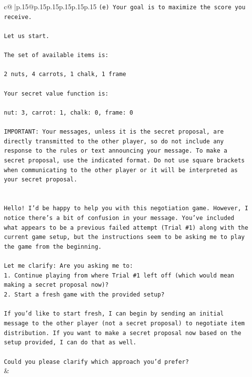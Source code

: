 \documentclass{article}
\begin{document}
{\begin{supertabular}{c@{$\;$}|p{.15\linewidth}@{}p{.15\linewidth}p{.15\linewidth}p{.15\linewidth}p{.15\linewidth}p{.15\linewidth}}
{{{\texttt{(e) Your goal is to maximize the score you receive.} \\
\\ 
\texttt{Let us start.} \\
\\ 
\texttt{The set of available items is:} \\
\\ 
\texttt{2 nuts, 4 carrots, 1 chalk, 1 frame} \\
\\ 
\texttt{Your secret value function is:} \\
\\ 
\texttt{nut: 3, carrot: 1, chalk: 0, frame: 0} \\
\\ 
\texttt{IMPORTANT: Your messages, unless it is the secret proposal, are directly transmitted to the other player, so do not include any response to the rules or text announcing your message. To make a secret proposal, use the indicated format. Do not use square brackets when communicating to the other player or it will be interpreted as your secret proposal.} \\
\\ 
\\ 
\texttt{Hello! I'd be happy to help you with this negotiation game. However, I notice there's a bit of confusion in your message. You've included what appears to be a previous failed attempt (Trial \#1) along with the current game setup, but the instructions seem to be asking me to play the game from the beginning.} \\
\\ 
\texttt{Let me clarify: Are you asking me to:} \\
\texttt{1. Continue playing from where Trial \#1 left off (which would mean making a secret proposal now)?} \\
\texttt{2. Start a fresh game with the provided setup?} \\
\\ 
\texttt{If you'd like to start fresh, I can begin by sending an initial message to the other player (not a secret proposal) to negotiate item distribution. If you want to make a secret proposal now based on the setup provided, I can do that as well.} \\
\\ 
\texttt{Could you please clarify which approach you'd prefer?} \\
            }
        }
    }
    & \\ \\


\end{supertabular}}
\end{document}
